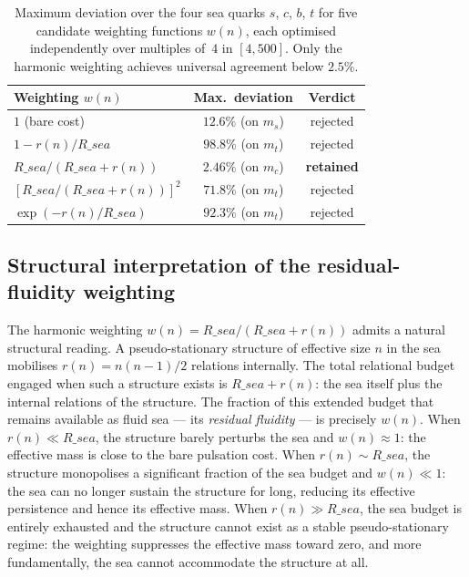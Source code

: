 \documentclass[12pt,a4paper]{article}
\def\Rsea{R\_sea}
\theoremstyle{plain}
\theoremstyle{definition}
\theoremstyle{remark}
\newcommand{\Rsea}{R_{\mathrm{sea}}}
\newcommand{\mstrange}{m_s}
\newcommand{\mcharm}{m_c}
\newcommand{\mtop}{m_t}
\begin{document}
\begin{table}[H]
\centering
\caption{Maximum deviation over the four sea quarks $s$, $c$, $b$, $t$ for five candidate weighting functions $w(n)$, each optimised independently over multiples of~$4$ in $[4, 500]$. Only the harmonic weighting achieves universal agreement below $2.5\%$.}
\label{tab:weightings}
\renewcommand{\arraystretch}{1.3}
\begin{tabular}{lcc}
\toprule
Weighting $w(n)$ & Max.\ deviation & Verdict \\
\midrule
$1$ (bare cost) & $12.6\%$ (on $\mstrange$) & rejected \\
$1 - r(n)/\Rsea$ & $98.8\%$ (on $\mtop$) & rejected \\
$\Rsea/(\Rsea + r(n))$ & $2.46\%$ (on $\mcharm$) & \textbf{retained} \\
$[\Rsea/(\Rsea + r(n))]^2$ & $71.8\%$ (on $\mtop$) & rejected \\
$\exp(-r(n)/\Rsea)$ & $92.3\%$ (on $\mtop$) & rejected \\
\bottomrule
\end{tabular}
\end{table}

\subsection{Structural interpretation of the residual-fluidity weighting}
\label{subsec:fluidity}

The harmonic weighting $w(n) = \Rsea/(\Rsea + r(n))$ admits a natural structural reading. A pseudo-stationary structure of effective size $n$ in the sea mobilises $r(n) = n(n-1)/2$ relations internally. The total relational budget engaged when such a structure exists is $\Rsea + r(n)$: the sea itself plus the internal relations of the structure. The fraction of this extended budget that remains available as fluid sea --- its \emph{residual fluidity} --- is precisely $w(n)$. When $r(n) \ll \Rsea$, the structure barely perturbs the sea and $w(n) \approx 1$: the effective mass is close to the bare pulsation cost. When $r(n) \sim \Rsea$, the structure monopolises a significant fraction of the sea budget and $w(n) \ll 1$: the sea can no longer sustain the structure for long, reducing its effective persistence and hence its effective mass. When $r(n) \gg \Rsea$, the sea budget is entirely exhausted and the structure cannot exist as a stable pseudo-stationary regime: the weighting suppresses the effective mass toward zero, and more fundamentally, the sea cannot accommodate the structure at all.
\end{document}
